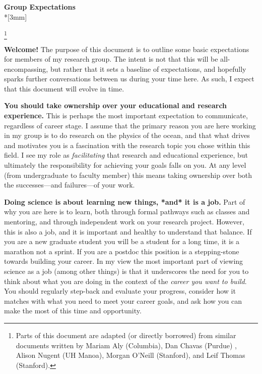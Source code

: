 \documentclass{classassignments}
\newcommand\blfootnote[1]{%
	\begingroup
	\renewcommand\thefootnote{}\footnote{#1}%
	\addtocounter{footnote}{-1}%
	\endgroup
}
\begin{document}

\begin{center}
	{\Large{\bf Group Expectations}}\\*[3mm]
\end{center}
\blfootnote{Parts of this document are adapted (or directly borrowed) from similar documents written by Mariam Aly (Columbia), Dan Chavas (Purdue) , Alison Nugent (UH Manoa), Morgan O'Neill (Stanford), and Leif Thomas (Stanford).}
\textbf{Welcome!} The purpose of this document is to outline some basic expectations for members of my research group. The intent is not that this will be all-encompassing, but rather that it sets a baseline of expectations, and hopefully sparks further conversations between us during your time here. As such, I expect that this document will evolve in time.\bigskip

\textbf{You should take ownership over your educational and research experience.} This is perhaps the most important expectation to communicate, regardless of career stage. I assume that the primary reason you are here working in my group is to do research on the physics of the ocean, and that what drives and motivates you is a fascination with the research topic you chose within this field. I see my role as \textit{facilitating} that research and educational experience, but ultimately the responsibility for achieving your goals falls on you. At any level (from undergraduate to faculty member) this means taking ownership over both the successes---and failures---of your work.\bigskip

\textbf{Doing science is about learning new things, *and* it is a job.} Part of why you are here is to learn, both through formal pathways such as classes and mentoring, and through independent work on your research project. However, this is also a job, and it is important and healthy to understand that balance. If you are a new graduate student you will be a student for a long time, it is a marathon not a sprint. If you are a postdoc this position is a stepping-stone towards building your career. In my view the most important part of viewing science as a job (among other things) is that it underscores the need for you to think about what you are doing in the context of the \textit{career you want to build}. You should regularly step-back and evaluate your progress, consider how it matches with what you need to meet your career goals, and ask how you can make the most of this time and opportunity. 
\end{document}

